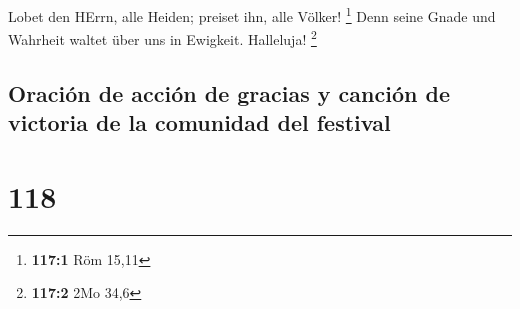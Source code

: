  Lobet den HErrn, alle Heiden; preiset ihn, alle Völker!
\footnote{\textbf{117:1} Röm 15,11}  Denn seine Gnade und
Wahrheit waltet über uns in Ewigkeit. Halleluja! \footnote{\textbf{117:2}
  2Mo 34,6}

\hypertarget{oraciuxf3n-de-acciuxf3n-de-gracias-y-canciuxf3n-de-victoria-de-la-comunidad-del-festival}{%
\subsection{Oración de acción de gracias y canción de victoria de la
comunidad del
festival}\label{oraciuxf3n-de-acciuxf3n-de-gracias-y-canciuxf3n-de-victoria-de-la-comunidad-del-festival}}

\hypertarget{section-117}{%
\section{118}\label{section-117}}

